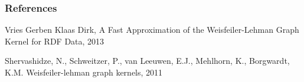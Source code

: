 \documentclass{beamer}
\begin{document}
\begingroup
\footnotesize
\begin{frame}
\frametitle{References}

\begin{thebibliography}{99} %

    Vries Gerben Klaas Dirk,
    A Fast Approximation of the Weisfeiler-Lehman Graph Kernel for RDF Data,
    2013

    Shervashidze, N., Schweitzer, P., van Leeuwen, E.J., Mehlhorn, K., Borgwardt, K.M.
    Weisfeiler-lehman graph kernels,
    2011
\end{thebibliography}

\end{frame}
\endgroup

\end{document}
